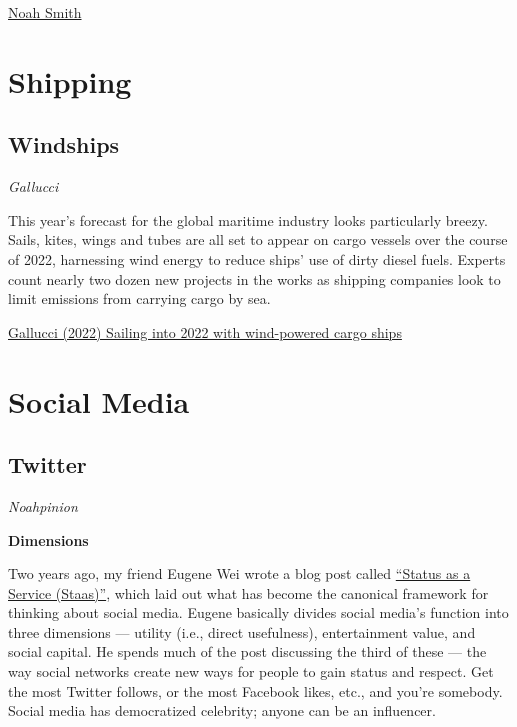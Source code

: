 \documentclass[
]{book}
\begin{document}
\href{https://noahpinion.substack.com/p/the-future-of-war-is-bizarre-and}{Noah Smith}

\hypertarget{shipping}{%
\chapter{Shipping}\label{shipping}}

\hypertarget{windships}{%
\section{Windships}\label{windships}}

\emph{Gallucci}

This year's forecast for the global maritime industry looks particularly breezy. Sails, kites, wings and tubes are all set to appear on cargo vessels over the course of 2022, harnessing wind energy to reduce ships' use of dirty diesel fuels. Experts count nearly two dozen new projects in the works as shipping companies look to limit emissions from carrying cargo by sea.

\href{https://www.canarymedia.com/articles/sea-transport/sailing-into-2022-with-wind-powered-cargo-ships}{Gallucci (2022) Sailing into 2022 with wind-powered cargo ships}

\hypertarget{social-media}{%
\chapter{Social Media}\label{social-media}}

\hypertarget{twitter}{%
\section{Twitter}\label{twitter}}

\emph{Noahpinion}

\textbf{Dimensions}

Two years ago, my friend Eugene Wei wrote a blog post called \href{https://www.eugenewei.com/blog/2019/2/19/status-as-a-service}{``Status as a Service (Staas)''}, which laid out what has become the canonical framework for thinking about social media. Eugene basically divides social media's function into three dimensions --- utility (i.e., direct usefulness), entertainment value, and social capital. He spends much of the post discussing the third of these --- the way social networks create new ways for people to gain status and respect. Get the most Twitter follows, or the most Facebook likes, etc., and you're somebody. Social media has democratized celebrity; anyone can be an influencer.
\end{document}
